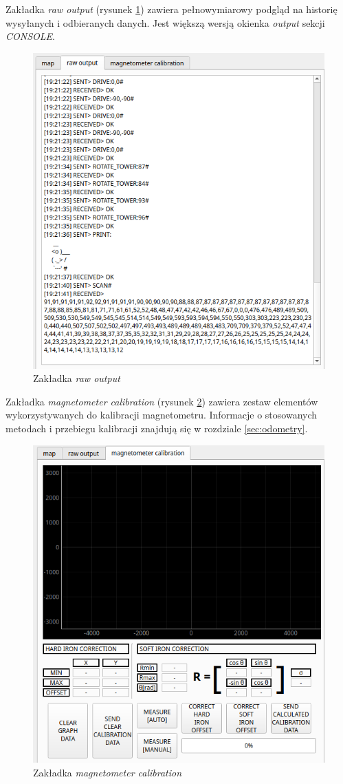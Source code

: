 Zakładka \emph{raw output} (rysunek \ref{fig:main-app-raw-output-section}) zawiera pełnowymiarowy podgląd na historię wysyłanych i odbieranych danych. Jest większą wersją okienka \emph{output} sekcji \emph{CONSOLE}.
\begin{figure}[ht]
	\centering
		\includegraphics[width=0.8\linewidth]{rys/main-app-view-raw-output.PNG}
	\caption{Zakładka \emph{raw output}}
	\label{fig:main-app-raw-output-section}
\end{figure}

Zakładka \emph{magnetometer calibration} (rysunek \ref{fig:main-app-mag-section}) zawiera zestaw elementów wykorzystywanych do kalibracji magnetometru. Informacje o stosowanych metodach i przebiegu kalibracji znajdują się w rozdziale \ref{sec:odometry}.
\begin{figure}[ht]
	\centering
		\includegraphics[width=0.8\linewidth]{rys/main-app-view-magnetom.PNG}
	\caption{Zakładka \emph{magnetometer calibration}}
	\label{fig:main-app-mag-section}
\end{figure}


